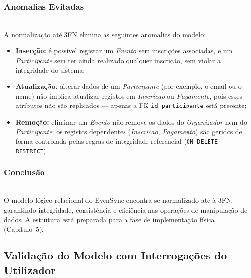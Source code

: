 \documentclass[runningheads]{llncs}
\begin{document}
                \subsubsection{Anomalias Evitadas}\mbox{}\\

                A normalização até 3FN elimina as seguintes anomalias do modelo:

                \begin{itemize}
                    \item \textbf{Inserção:} é possível registar um \textit{Evento} sem inscrições
                    associadas, e um \textit{Participante} sem ter ainda realizado qualquer inscrição,
                    sem violar a integridade do sistema;

                    \item \textbf{Atualização:} alterar dados de um \textit{Participante} (por exemplo,
                    o email ou o nome) não implica atualizar registos em \textit{Inscricao} ou
                    \textit{Pagamento}, pois esses atributos não são replicados --- apenas a FK
                    \texttt{id\_participante} está presente;

                    \item \textbf{Remoção:} eliminar um \textit{Evento} não remove os dados do
                    \textit{Organizador} nem do \textit{Participante}; os registos dependentes
                    (\textit{Inscricao}, \textit{Pagamento}) são geridos de forma controlada
                    pelas regras de integridade referencial (\texttt{ON DELETE RESTRICT}).
                \end{itemize}

                \subsubsection{Conclusão}\mbox{}\\

                O modelo lógico relacional do EvenSync encontra-se normalizado até à 3FN,
                garantindo integridade, consistência e eficiência nas operações de manipulação
                de dados. A estrutura está preparada para a fase de implementação física
                (Capítulo~5).

                \subsection{Validação do Modelo com Interrogações do Utilizador}
\end{document}
